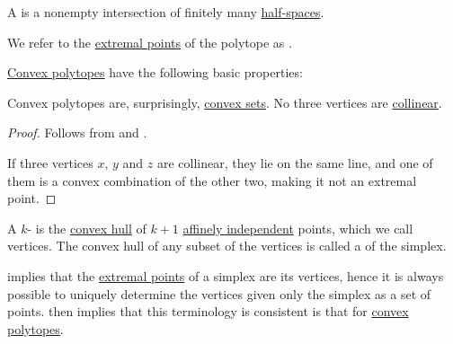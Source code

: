 \begin{definition}\label{def:convex_polytope}\mimprovised
  A  is a nonempty intersection of finitely many \hyperref[def:half_space]{half-spaces}.

  We refer to the \hyperref[def:extremal_point]{extremal points} of the polytope as .
\end{definition}

\begin{proposition}\label{thm:def:convex_polytope}
  \hyperref[def:convex_polytope]{Convex polytopes} have the following basic properties:
  \begin{thmenum}
     Convex polytopes are, surprisingly, \hyperref[def:convex_hull]{convex sets}.
     No three vertices are \hyperref[def:collinear_points]{collinear}.
  \end{thmenum}
\end{proposition}
\begin{proof}
   Follows from  and .

   If three vertices \( x \), \( y \) and \( z \) are collinear, they lie on the same line, and one of them is a convex combination of the other two, making it not an extremal point.
\end{proof}

\begin{definition}\label{def:simplex}\mimprovised
  A \( k \)- is the \hyperref[def:convex_hull]{convex hull} of \( k + 1 \) \hyperref[def:affine_dependence]{affinely independent} points, which we call vertices. The convex hull of any subset of the vertices is called a  of the simplex.

   implies that the \hyperref[def:extremal_point]{extremal points} of a simplex are its vertices, hence it is always possible to uniquely determine the vertices given only the simplex as a set of points.  then implies that this terminology is consistent is that for \hyperref[def:convex_polytope]{convex polytopes}.
\end{definition}

